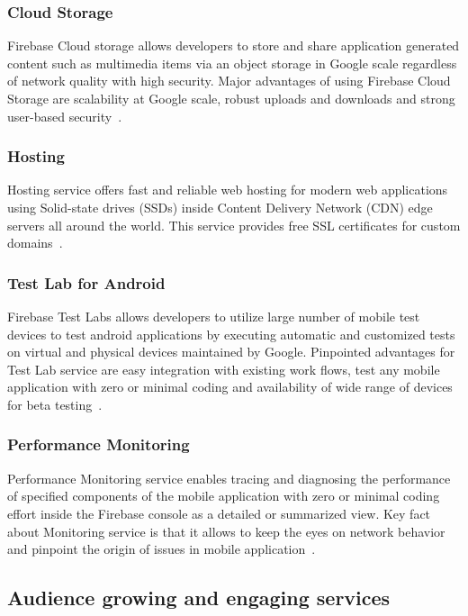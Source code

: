 \subsubsection{Cloud Storage} Firebase Cloud storage allows developers
to store and share application generated content such as multimedia
items via an object storage in Google scale regardless of network
quality with high security. Major advantages of using Firebase Cloud
Storage are scalability at Google scale, robust uploads and downloads
and strong user-based
security~\cite{hid-sp18-409-www-firebase-products}.

\subsubsection{Hosting} Hosting service offers fast and reliable web
hosting for modern web applications using Solid-state drives (SSDs)
inside Content Delivery Network (CDN) edge servers all around the
world. This service provides free SSL certificates for custom
domains~\cite{hid-sp18-409-www-firebase,
  hid-sp18-409-www-firebase-products}.

\subsubsection{Test Lab for Android } Firebase Test Labs allows
developers to utilize large number of mobile test devices to test
android applications by executing automatic and customized tests on
virtual and physical devices maintained by Google. Pinpointed
advantages for Test Lab service are easy integration with existing
work flows, test any mobile application with zero or minimal coding
and availability of wide range of devices for beta
testing~\cite{hid-sp18-409-www-firebase-products}.

\subsubsection{Performance Monitoring} Performance Monitoring service
enables tracing and diagnosing the performance of specified components
of the mobile application with zero or minimal coding effort inside
the Firebase console as a detailed or summarized view. Key fact about
Monitoring service is that it allows to keep the eyes on network
behavior and pinpoint the origin of issues in mobile
application~\cite{hid-sp18-409-www-firebase-products}.


\subsection{Audience growing and engaging services}

